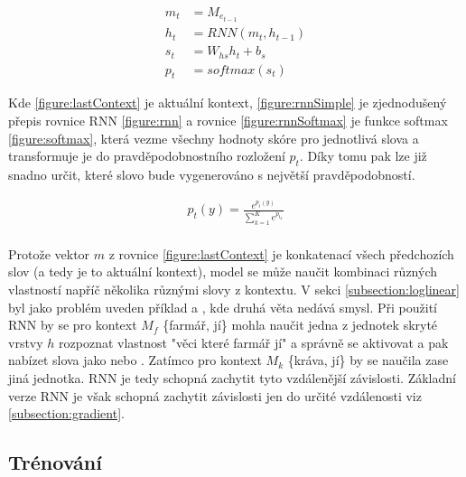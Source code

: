 \begin{align}
  m_{t}&=M_{e_{t-1}}\label{figure:lastContext} \\
  h_{t}&=RNN(m_t, h_{t-1}) \label{figure:rnnSimple} \\
  s_{t}&=W_{hs}h_t + b_s \label{figure:rnnSt} \\
  p_{t}&=softmax(s_t) \label{figure:rnnSoftmax}
\end{align}


Kde \ref{figure:lastContext} je aktuální kontext, \ref{figure:rnnSimple} je zjednodušený přepis rovnice RNN \ref{figure:rnn} a rovnice \ref{figure:rnnSoftmax} je funkce softmax \ref{figure:softmax}, která vezme všechny hodnoty skóre pro jednotlivá slova a transformuje je do pravděpodobnostního rozložení $p_t$. Díky tomu pak lze již snadno určit, které slovo bude vygenerováno s největší pravděpodobností.


\begin{align}\label{figure:softmax}
  p_t(y)={\frac {e^{p_{t}(y)}}{\sum _{k=1}^{K}e^{p_{t_{k}}}}}
\end{align}
\\


Protože vektor $m$ z rovnice \ref{figure:lastContext} je konkatenací všech předchozích slov (a tedy je to aktuální kontext), model se může naučit kombinaci různých vlastností napříč několika různými slovy z kontextu. V sekci \ref{subsection:loglinear} byl jako problém uveden příklad  a , kde druhá věta nedává smysl. Při použití RNN by se pro kontext $M_f$  \{farmář, jí\} mohla naučit jedna z jednotek skryté vrstvy $h$ rozpoznat vlastnost "věci které farmář jí" a správně se aktivovat a pak nabízet slova jako  nebo . Zatímco pro kontext $M_k$ \{kráva, jí\} by se naučila zase jiná jednotka. RNN je tedy schopná zachytit tyto vzdálenější závislosti. Základní verze RNN je však schopná zachytit závislosti jen do určité vzdálenosti viz \ref{subsection:gradient}.



\subsection{Trénování} \label{subsection:training}

